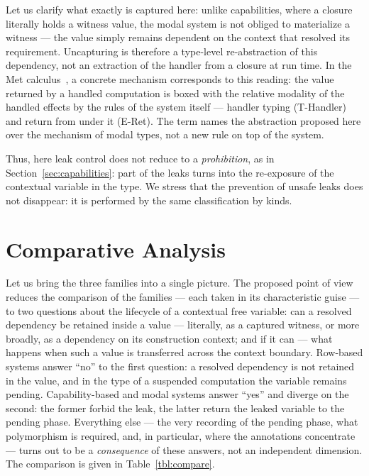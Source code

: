 \documentclass[11pt]{article}
\begin{document}
Let us clarify what exactly is captured here: unlike
capabilities, where a closure literally holds a witness value,
the modal system is not obliged to materialize a witness --- the value simply remains
dependent on the context that resolved its requirement. Uncapturing is therefore a
type-level re-abstraction of this dependency, not an extraction of the handler from a
closure at run time. In the Met calculus~\cite{tang2025modal}, a concrete mechanism
corresponds to this reading: the value returned by a handled computation is boxed with
the relative modality of the handled effects by the rules of the system itself --- handler
typing (T-Handler) and return from under it (E-Ret). The term names the abstraction
proposed here over the mechanism of modal types, not a new rule on top of the system.

Thus, here leak control does not reduce to a \emph{prohibition}, as in
Section~\ref{sec:capabilities}: part of the leaks turns into the re-exposure of the
contextual variable in the type. We stress that the prevention of
unsafe leaks does not disappear: it is performed by the same classification by kinds.


\section{Comparative Analysis}
\label{sec:comparison}

Let us bring the three families into a single picture. The proposed point of view reduces the
comparison of the families --- each taken in its characteristic guise --- to two questions about
the lifecycle of a contextual free variable: can a resolved dependency be retained inside a
value --- literally, as a captured witness, or more broadly, as a dependency on its construction
context; and if it can --- what happens when such a value is transferred across the context
boundary. Row-based systems answer \enquote{no} to the first question: a resolved dependency is
not retained in the value, and in the type of a suspended computation the variable remains
pending. Capability-based and modal systems answer \enquote{yes} and diverge on the second: the
former forbid the leak, the latter return the leaked variable to the pending phase. Everything
else --- the very recording of the pending phase, what polymorphism is required, and, in
particular, where the annotations concentrate --- turns out to be a \emph{consequence} of these
answers, not an independent dimension. The comparison is given in Table~\ref{tbl:compare}.
\end{document}
